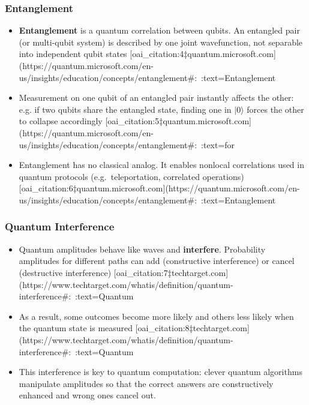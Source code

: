 \documentclass{beamer}
\begin{document}
\begin{frame}
\frametitle{Entanglement}
\begin{itemize}
  \item {\bf Entanglement} is a quantum correlation between qubits.  An entangled pair (or multi-qubit system) is described by one joint wavefunction, not separable into independent qubit states [oai_citation:4‡quantum.microsoft.com](https://quantum.microsoft.com/en-us/insights/education/concepts/entanglement#:~:text=Entanglement%
  \item Measurement on one qubit of an entangled pair instantly affects the other: e.g. if two qubits share the entangled state, finding one in $|0\rangle$ forces the other to collapse accordingly [oai_citation:5‡quantum.microsoft.com](https://quantum.microsoft.com/en-us/insights/education/concepts/entanglement#:~:text=for%
  \item Entanglement has no classical analog.  It enables nonlocal correlations used in quantum protocols (e.g.\ teleportation, correlated operations) [oai_citation:6‡quantum.microsoft.com](https://quantum.microsoft.com/en-us/insights/education/concepts/entanglement#:~:text=Entanglement%
\end{itemize}
\end{frame}

\begin{frame}
\frametitle{Quantum Interference}
\begin{itemize}
  \item Quantum amplitudes behave like waves and {\bf interfere}.  Probability amplitudes for different paths can add (constructive interference) or cancel (destructive interference) [oai_citation:7‡techtarget.com](https://www.techtarget.com/whatis/definition/quantum-interference#:~:text=Quantum%
  \item As a result, some outcomes become more likely and others less likely when the quantum state is measured [oai_citation:8‡techtarget.com](https://www.techtarget.com/whatis/definition/quantum-interference#:~:text=Quantum%
  \item This interference is key to quantum computation: clever quantum algorithms manipulate amplitudes so that the correct answers are constructively enhanced and wrong ones cancel out.
\end{itemize}
\end{frame}
\end{document}
